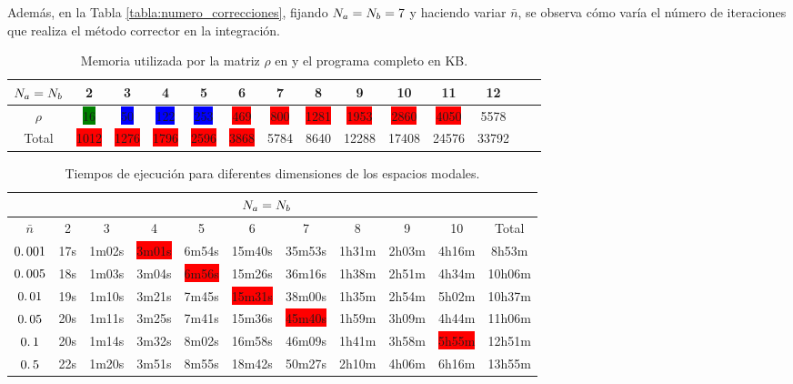 \quad Adem\'as, en la Tabla \ref{tabla:numero_correcciones}, fijando $N_a=N_b=7$ y haciendo variar $\bar{n}$, se observa c\'omo var\'ia el n\'umero de iteraciones que realiza el m\'etodo corrector en la integraci\'on.

\begin{table}[h]
\centering
\begin{tabular}{|c|c|c|c|c|c|c|c|c|c|c|c|c|c|}
\hline $N_a=N_b$ & 2 &3 & 4& 5& 6&7 & 8&9 &10&11&12\\
\hline$\rho$ &\colorbox{green}{16}&\colorbox{blue}{50}&\colorbox{blue}{122}&\colorbox{blue}{253}&\colorbox{red}{469}&\colorbox{red}{800}&    \colorbox{red}{1281}&\colorbox{red}{1953}&\colorbox{red}{2860}&\colorbox{red}{4050}&    5578\\
\hline Total &\colorbox{red}{1012}&    \colorbox{red}{1276}&    \colorbox{red}{1796}&    \colorbox{red}{2596}&    \colorbox{red}{3868}&    5784&    8640&    12288&    17408&    24576&    33792\\
\hline
\end{tabular} \caption{Memoria utilizada por la matriz $\rho$ en y el programa completo en KB. }\label{tabla:cantidad_memoria_rho}
\end{table}

\begin{table}[h]
\centering
\begin{tabular}{|c|c|c|c|c|c|c|c|c|c|c|}
\hline &\multicolumn{9}{|c|}{$N_a=N_b$}&\\
\hline $\bar{n}$& 2&3&4&5&6&7&8&9&10&Total\\
\hline $0\ldotp001$& 17s &1m02s & \colorbox{red}{3m01s} & 6m54s & 15m40s & 35m53s& 1h31m & 2h03m & 4h16m &8h53m\\
\hline $0\ldotp 005$&18s &1m03s & 3m04s & \colorbox{red}{6m56s} & 15m26s & 36m16s & 1h38m & 2h51m & 4h34m & 10h06m\\
\hline $0\ldotp 01$& 19s &1m10s & 3m21s & 7m45s & \colorbox{red}{15m31s} & 38m00s & 1h35m & 2h54m & 5h02m&10h37m\\
\hline $0\ldotp 05$& 20s &1m11s & 3m25s & 7m41s & 15m36s & \colorbox{red}{45m40s} & 1h59m & 3h09m & 4h44m&11h06m\\
 \hline $0\ldotp 1$& 20s &1m14s & 3m32s & 8m02s & 16m58s & 46m09s & 1h41m & 3h58m & \colorbox{red}{5h55m}&12h51m\\
 \hline $0\ldotp 5$& 22s &1m20s & 3m51s & 8m55s & 18m42s & 50m27s & 2h10m & 4h06m & 6h16m&13h55m\\
\hline
\end{tabular}\caption{Tiempos de ejecuci\'on para diferentes dimensiones de los espacios modales.}\label{tabla:tiempos_modos}
\end{table}

